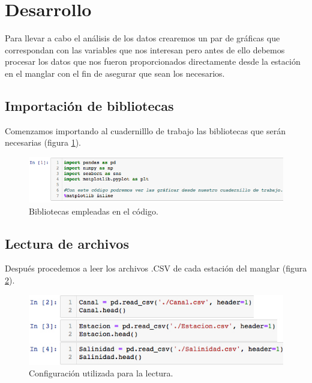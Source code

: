 \documentclass[12pt]{article}
\begin{document}
\section{Desarrollo}

\noindent Para llevar a cabo el análisis de los datos crearemos un par de gráficas que correspondan con las variables que nos interesan pero antes de ello debemos procesar los datos que nos fueron proporcionados directamente desde la estación en el manglar con el fin de asegurar que sean los necesarios.

\subsection{Importación de bibliotecas}

\noindent Comenzamos importando al cuadernilllo de trabajo las bibliotecas que serán necesarias (figura \ref{fig:importacion}).

\begin{figure}[h!]
	\raggedright
	\includegraphics[scale=.6]{./Images/importacion}
	\caption{\label{fig:importacion} Bibliotecas empleadas en el código.}
\end{figure}

\subsection{Lectura de archivos}

\noindent Después procedemos a leer los archivos .CSV de cada estación del manglar (figura \ref{fig:lectura}).

\begin{figure}[h!]
	\center
	\includegraphics[scale=.6]{./Images/lectura}
	\caption{\label{fig:lectura} Configuración utilizada para la lectura.}
\end{figure}
\end{document}

